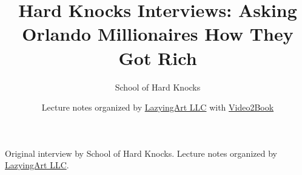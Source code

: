 \documentclass[11pt,oneside]{book}
\begin{document}
\frontmatter
\title{Hard Knocks Interviews: Asking Orlando Millionaires How They Got Rich}
\author{School of Hard Knocks}
\date{Lecture notes organized by \href{https://lazying.art}{LazyingArt LLC} with \href{https://github.com/lachlanchen/Video2Book}{Video2Book}}
\maketitle
\begin{center}
\small Original interview by School of Hard Knocks. Lecture notes organized by \href{https://lazying.art}{LazyingArt LLC}.
\end{center}
\clearpage
\mainmatter

\end{document}
